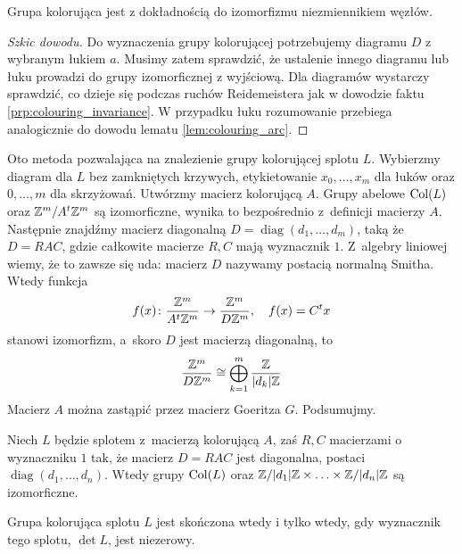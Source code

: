 \begin{proposition}
    Grupa kolorująca jest z dokładnością do izomorfizmu niezmiennikiem węzłów.
\end{proposition}

\begin{proof}[Szkic dowodu]
    Do wyznaczenia grupy kolorującej potrzebujemy diagramu $D$ z wybranym łukiem $a$.
    Musimy zatem sprawdzić, że ustalenie innego diagramu lub łuku prowadzi do grupy izomorficznej z wyjściową.
    Dla diagramów wystarczy sprawdzić, co dzieje się podczas ruchów Reidemeistera jak w dowodzie faktu \ref{prp:colouring_invariance}.
    W przypadku łuku rozumowanie przebiega analogicznie do dowodu lematu \ref{lem:colouring_arc}.
\end{proof}

Oto metoda pozwalająca na znalezienie grupy kolorującej splotu $L$.
Wybierzmy diagram dla $L$ bez zamkniętych krzywych, etykietowanie $x_0, \ldots, x_m$ dla łuków oraz $0, \ldots, m$ dla skrzyżowań.
Utwórzmy macierz kolorującą $A$.
Grupy abelowe $\operatorname{Col}(L)$ oraz $\mathbb Z^m / A^t \mathbb Z^m$ są izomorficzne, wynika to bezpośrednio z~definicji macierzy $A$.
Następnie znajdźmy macierz diagonalną $D = \operatorname{diag}(d_1, \ldots, d_m)$, taką że $D = RAC$, gdzie całkowite macierze $R, C$ mają wyznacznik $1$.
Z~algebry liniowej wiemy, że to zawsze się uda: macierz $D$ nazywamy postacią normalną Smitha.
Wtedy funkcja
\begin{equation}
    f(x) \colon \frac{\mathbb Z^m}{A^t \mathbb Z^m} \to \frac{\mathbb Z^m}{D\mathbb Z^m}, \quad f(x) = C^t x
\end{equation}
stanowi izomorfizm, a~skoro $D$ jest macierzą diagonalną, to
\begin{equation}
    \frac{\mathbb Z^m}{D\mathbb Z^m} \cong \bigoplus_{k=1}^m \frac{\mathbb Z}{|d_k| \mathbb Z}
\end{equation}
Macierz $A$ można zastąpić przez macierz Goeritza $G$.
Podsumujmy.

\begin{proposition}
    Niech $L$ będzie splotem z~macierzą kolorującą $A$, zaś $R, C$ macierzami o wyznaczniku $1$ tak, że macierz $D=RAC$ jest diagonalna, postaci $\operatorname{diag}(d_1, \ldots, d_n)$.
    Wtedy grupy $\operatorname{Col}(L)$ oraz $\mathbb Z/|d_1| \mathbb Z \times \ldots \times \mathbb Z/|d_n| \mathbb Z$ są izomorficzne.
\end{proposition}

\begin{corollary}
    Grupa kolorująca splotu $L$ jest skończona wtedy i tylko wtedy, gdy wyznacznik tego splotu, $\det L$, jest niezerowy.
\end{corollary}

